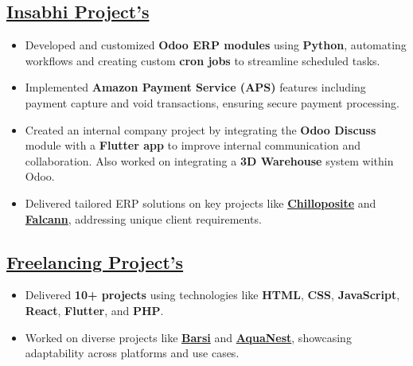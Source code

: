 \subsection{{\href{https://www.insabhi.com}{Insabhi Project's} \hfill}}
{\color{black}%
\begin{itemize}[itemsep=0.1em, parsep=0pt, topsep=0pt]
\item Developed and customized \textbf{Odoo ERP modules} using \textbf{Python}, automating workflows and creating custom \textbf{cron jobs} to streamline scheduled tasks.
\item Implemented \textbf{Amazon Payment Service (APS)} features including payment capture and void transactions, ensuring secure payment processing.
\item Created an internal company project by integrating the \textbf{Odoo Discuss} module with a \textbf{Flutter app} to improve internal communication and collaboration. Also worked on integrating a \textbf{3D Warehouse} system within Odoo.
\item Delivered tailored ERP solutions on key projects like \href{https://chillopositefestival.com/}{\textbf{Chilloposite}} and \href{https://falcann.com/}{\textbf{Falcann}}, addressing unique client requirements.
\end{itemize}%
}

\subsection{{\href{}{Freelancing Project's} \hfill }}
{\color{black}%
\begin{itemize}[itemsep=0.1em, parsep=0pt, topsep=0pt]
\item Delivered \textbf{10+ projects} using technologies like \textbf{HTML}, \textbf{CSS}, \textbf{JavaScript}, \textbf{React}, \textbf{Flutter}, and \textbf{PHP}.
\item Worked on diverse projects like \href{https://barsiwebsite.netlify.app/}{\textbf{Barsi}} and \href{https://watersupplier.netlify.app/}{\textbf{AquaNest}}, showcasing adaptability across platforms and use cases.
\end{itemize}%
}

